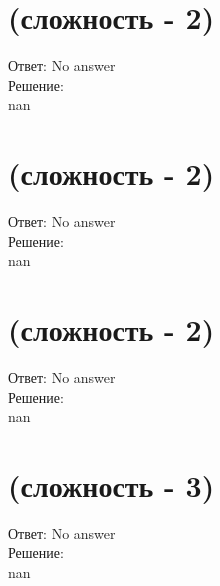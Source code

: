 \documentclass{article}%
\begin{document}
%
\section{(сложность {-} 2)}%
\label{sec:( {-} 2)}%
\hspace{3ex} Ответ: No answer \\%
%
\hspace*{3ex} Решение: \\%
nan

%
\section{(сложность {-} 2)}%
\label{sec:( {-} 2)}%
\hspace{3ex} Ответ: No answer \\%
%
\hspace*{3ex} Решение: \\%
nan

%
\section{(сложность {-} 2)}%
\label{sec:( {-} 2)}%
\hspace{3ex} Ответ: No answer \\%
%
\hspace*{3ex} Решение: \\%
nan

%
\section{(сложность {-} 3)}%
\label{sec:( {-} 3)}%
\hspace{3ex} Ответ: No answer \\%
%
\hspace*{3ex} Решение: \\%
nan

%
\end{document}
